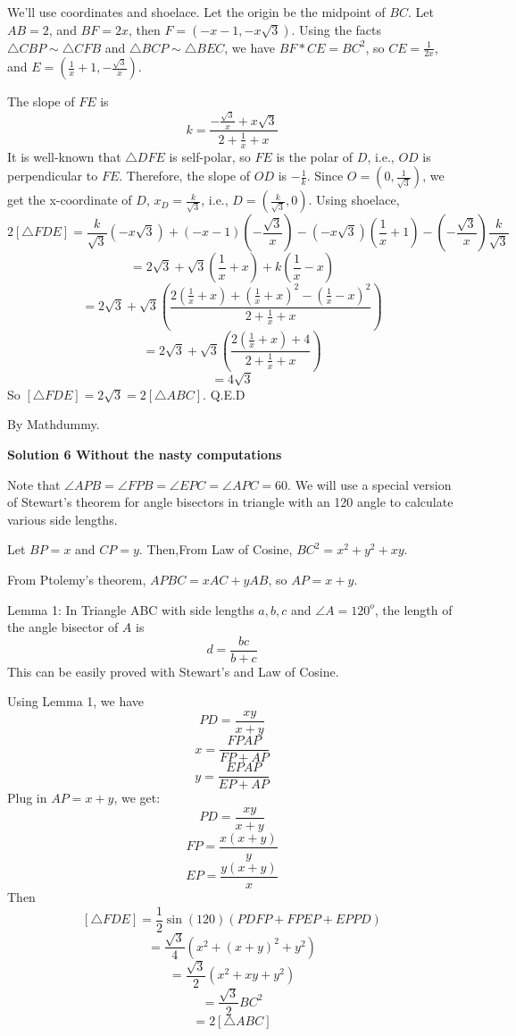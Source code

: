 \begin{enumerate}
 We'll use coordinates and shoelace. Let the origin be the midpoint of $BC$. Let $AB=2$, and $BF = 2x$, then $F=(-x-1,-x\sqrt{3})$. Using the facts $\triangle{CBP} \sim  \triangle{CFB}$ and $\triangle{BCP} \sim  \triangle{BEC}$, we have $BF * CE = BC^2$, so $CE = \frac{1}{2x}$, and $E = (\frac{1}{x}+1,-\frac{\sqrt{3}}{x})$.

 The slope of $FE$ is 
 \[k = \frac{-\frac{\sqrt{3}}{x} + x\sqrt{3}}{2+\frac{1}{x}+x}\]It is well-known that $\triangle{DFE}$ is self-polar, so $FE$ is the polar of $D$, i.e., $OD$ is perpendicular to $FE$. Therefore, the slope of $OD$ is $-\frac{1}{k}$. Since $O=(0,\frac{1}{\sqrt{3}})$, we get the x-coordinate of $D$, $x_D = \frac{k}{\sqrt{3}}$, i.e., $D = (\frac{k}{\sqrt{3}},0)$. Using shoelace,
 \[2[\triangle{FDE}] = \frac{k}{\sqrt{3}}(-x\sqrt{3})+(-x-1)(-\frac{\sqrt{3}}{x})-   (-x\sqrt{3})(\frac{1}{x}+1) - (-\frac{\sqrt{3}}{x})\frac{k}{\sqrt{3}}\]
 \[= 2\sqrt{3} + \sqrt{3}(\frac{1}{x}+x) + k(\frac{1}{x} - x)\]
 \[= 2\sqrt{3} + \sqrt{3}(\frac{2(\frac{1}{x}+x)+(\frac{1}{x}+x)^2-(\frac{1}{x}-x)^2} {2+\frac{1}{x}+x})\]
 \[= 2\sqrt{3} + \sqrt{3}(\frac{2(\frac{1}{x}+x)+4}{2+\frac{1}{x}+x})\]
 \[= 4\sqrt{3}\]So $[\triangle{FDE}] = 2\sqrt{3} = 2[\triangle{ABC}]$. Q.E.D

 By Mathdummy.

 



\textbf{Solution 6 Without the nasty computations}

Note that $\angle{APB}=\angle{FPB}=\angle{EPC}=\angle{APC} = 60$. We will use a special version of Stewart's theorem for angle bisectors in triangle with an 120 angle to calculate various side lengths. 

 Let $BP = x$ and $CP = y$. Then,From Law of Cosine, $BC^2 = x^2 + y^2 + xy$. 

 From Ptolemy's theorem, $AP BC = x AC + y AB$, so $AP = x + y$.

 Lemma 1: In Triangle ABC with side lengths $a,b,c$ and $\angle A =120^o$, the length of the angle bisector of $A$ is 
 \[d = \frac{bc}{b+c}\]This can be easily proved with Stewart's and Law of Cosine.

 Using Lemma 1, we have 
 \[PD = \frac{xy}{x+y}\]
 \[x = \frac{FP AP}{FP + AP}\]
 \[y = \frac{EP AP}{EP + AP}\]Plug in $AP=x+y$, we get: 
 \[PD = \frac{xy}{x+y}\] 
 \[FP = \frac{x(x+y)}{y}\]
 \[EP = \frac{y(x+y)}{x}\]Then
 \[[\triangle{FDE}] = \frac{1}{2}\sin(120)(PDFP + FPEP + EPPD)\]
 \[= \frac{\sqrt{3}}{4}(x^2 + (x+y)^2 + y^2)\]
 \[= \frac{\sqrt{3}}{2}(x^2 + xy + y^2)\]
 \[= \frac{\sqrt{3}}{2} BC^2\]
 \[= 2 [\triangle{ABC}]\]


\end{enumerate}
